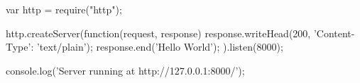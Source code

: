 var http = require("http");

http.createServer(function(request, response) {
   response.writeHead(200, {'Content-Type': 'text/plain'});
   response.end('Hello World\n');
}).listen(8000);

console.log('Server running at http://127.0.0.1:8000/');